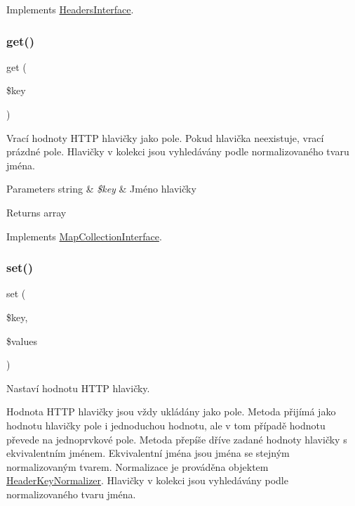 Implements \mbox{\hyperlink{interface_pes_1_1_http_1_1_headers_interface}{Headers\+Interface}}.

\mbox{\label{class_pes_1_1_http_1_1_headers_a24a9bf83a1002d46ece83a93d14bd921}} 
\subsubsection{\texorpdfstring{get()}{get()}}
{\footnotesize\ttfamily get (\begin{DoxyParamCaption}\item[{}]{\$key }\end{DoxyParamCaption})}

Vrací hodnoty H\+T\+TP hlavičky jako pole. Pokud hlavička neexistuje, vrací prázdné pole. Hlavičky v kolekci jsou vyhledávány podle normalizovaného tvaru jména.


\begin{DoxyParams}[1]{Parameters}
string & {\em \$key} & Jméno hlavičky\\
\hline
\end{DoxyParams}
\begin{DoxyReturn}{Returns}
array 
\end{DoxyReturn}


Implements \mbox{\hyperlink{interface_pes_1_1_collection_1_1_map_collection_interface}{Map\+Collection\+Interface}}.

\mbox{\label{class_pes_1_1_http_1_1_headers_a48fd9971b1dacbb991a7c35db3b7114a}} 
\subsubsection{\texorpdfstring{set()}{set()}}
{\footnotesize\ttfamily set (\begin{DoxyParamCaption}\item[{}]{\$key,  }\item[{}]{\$values }\end{DoxyParamCaption})}

Nastaví hodnotu H\+T\+TP hlavičky.

Hodnota H\+T\+TP hlavičky jsou vždy ukládány jako pole. Metoda přijímá jako hodnotu hlavičky pole i jednoduchou hodnotu, ale v tom případě hodnotu převede na jednoprvkové pole. Metoda přepíše dříve zadané hodnoty hlavičky s ekvivalentním jménem. Ekvivalentní jména jsou jména se stejným normalizovaným tvarem. Normalizace je prováděna objektem \mbox{\hyperlink{class_pes_1_1_http_1_1_header_key_normalizer}{Header\+Key\+Normalizer}}. Hlavičky v kolekci jsou vyhledávány podle normalizovaného tvaru jména.


